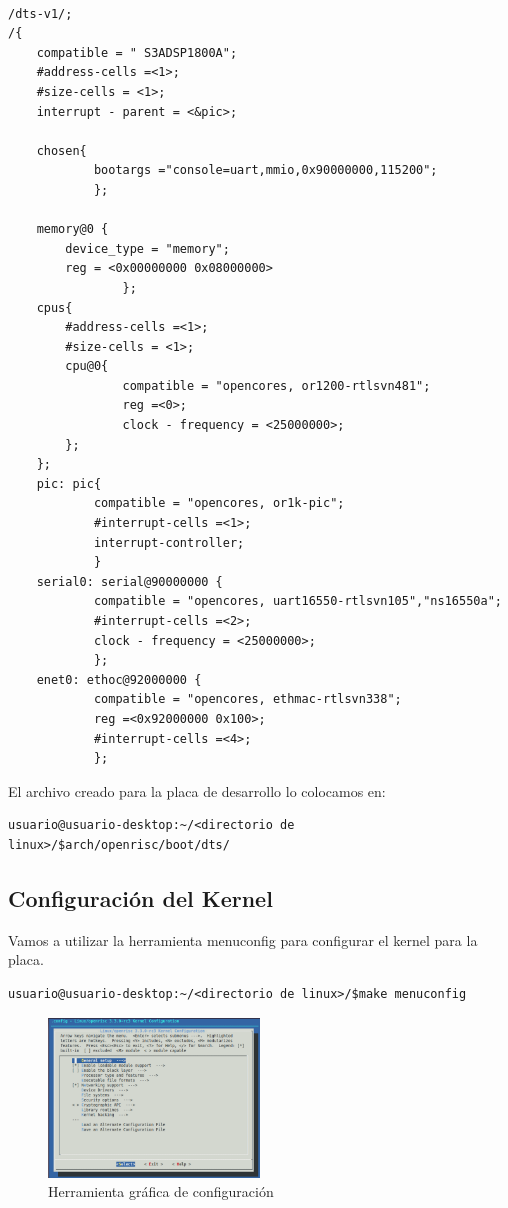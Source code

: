 \begin{lstlisting}[frame=single,caption={Xilinxs3a.dts},label={lst:dts}]

/dts-v1/;
/{
	compatible = " S3ADSP1800A";
	#address-cells =<1>;
	#size-cells = <1>;
	interrupt - parent = <&pic>;
	
	chosen{
			bootargs ="console=uart,mmio,0x90000000,115200";
			};
	
	memory@0 {
		device_type = "memory";
		reg = <0x00000000 0x08000000>
				};
	cpus{
		#address-cells =<1>;
		#size-cells = <1>;
		cpu@0{
				compatible = "opencores, or1200-rtlsvn481";
				reg =<0>;
				clock - frequency = <25000000>;
		};
	};
	pic: pic{
			compatible = "opencores, or1k-pic";
			#interrupt-cells =<1>;
			interrupt-controller;
			}
	serial0: serial@90000000 {
			compatible = "opencores, uart16550-rtlsvn105","ns16550a";
			#interrupt-cells =<2>;
			clock - frequency = <25000000>;
			};
	enet0: ethoc@92000000 {
			compatible = "opencores, ethmac-rtlsvn338";
			reg =<0x92000000 0x100>;
			#interrupt-cells =<4>;
			};
	 \end{lstlisting}

El archivo creado para la placa de desarrollo lo colocamos en: 

\begin{lstlisting}[breaklines]
usuario@usuario-desktop:~/<directorio de linux>/$arch/openrisc/boot/dts/
\end{lstlisting}

\subsection{Configuración del Kernel}

Vamos a utilizar la herramienta menuconfig para configurar el kernel para la placa. 

\begin{lstlisting}[breaklines]
usuario@usuario-desktop:~/<directorio de linux>/$make menuconfig
\end{lstlisting}

\begin{figure}[h!]
 \begin{center}
  \includegraphics[width=0.5\textwidth,keepaspectratio=true]{./images/menuconf}
  \caption{Herramienta gráfica de configuración}
 \end{center}
\end{figure}

